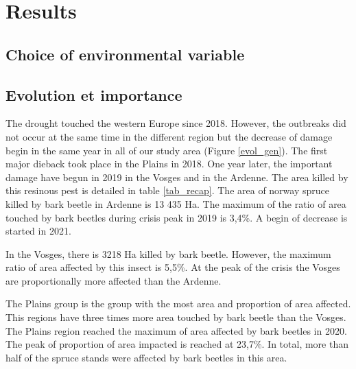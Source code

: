 \documentclass[3p,procedia]{elsarticle}
\begin{document}
	






\section{Results}

\subsection{Choice of environmental variable}

\subsection{Evolution et importance}

The drought touched the western Europe since 2018.
However, the outbreaks did not occur at the same time in the different region but the decrease of damage begin in the same year in all of our study area (Figure \ref{evol_gen}).
The first major dieback took place in the Plains in 2018.
One year later, the important damage have begun in 2019 in the Vosges and in the Ardenne.  
The area killed by this resinous pest is detailed in table \ref{tab_recap}.
The area of norway spruce killed by bark beetle in Ardenne is 13 435 Ha.
The maximum of the ratio of area touched by bark beetles during crisis peak in 2019 is 3,4\%. 
A begin of decrease is started in 2021.

In the Vosges, there is 3218 Ha killed by bark beetle.
However, the maximum ratio of area affected by this insect is 5,5\%.
At the peak of the crisis the Vosges are proportionally more affected than the Ardenne.

The Plains group is the group with the most area and proportion of area affected.
This regions have three times more area touched by bark beetle than the Vosges.
The Plains region reached the maximum of area affected by bark beetles in 2020. 
The peak of proportion of area impacted is reached at 23,7\%.
In total, more than half of the spruce stands were affected by bark beetles in this area.
\end{document}
